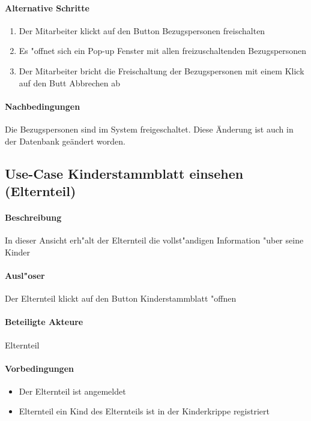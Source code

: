		\paragraph{Alternative Schritte}
		\begin{enumerate}
			\item Der Mitarbeiter klickt auf den Button \dq Bezugspersonen freischalten\dq
			\item Es "offnet sich ein Pop-up Fenster mit allen freizuschaltenden Bezugspersonen
			\item Der Mitarbeiter bricht die Freischaltung der Bezugspersonen mit einem Klick auf den Butt \dq Abbrechen \dq ab
		\end{enumerate}
			
		\paragraph{Nachbedingungen}
		Die Bezugspersonen sind im System freigeschaltet. Diese Änderung ist auch in der Datenbank geändert worden. 
		
		
		
		
		\newpage
		\subsection{Use-Case Kinderstammblatt einsehen (Elternteil)}
		\paragraph{Beschreibung}
		In dieser Ansicht erh"alt der Elternteil die vollst"andigen Information "uber seine Kinder
		\paragraph{Ausl"oser}
		Der Elternteil klickt auf den Button \dq Kinderstammblatt "offnen\dq
		\paragraph{Beteiligte Akteure}   \leavevmode \newline
		Elternteil
		\paragraph{Vorbedingungen}
		\begin{itemize}
			\item Der Elternteil ist angemeldet
			\item Elternteil ein Kind des Elternteils ist in der Kinderkrippe registriert
		\end{itemize}
		
